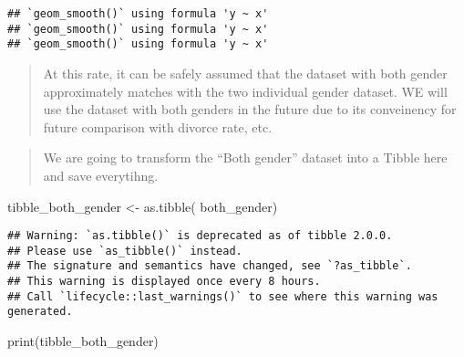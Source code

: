 \documentclass[
]{article}
\newenvironment{Shaded}{\begin{snugshade}}{\end{snugshade}}
\newcommand{\FunctionTok}[1]{\textcolor[rgb]{0.00,0.00,0.00}{#1}}
\newcommand{\NormalTok}[1]{#1}
\newcommand{\OtherTok}[1]{\textcolor[rgb]{0.56,0.35,0.01}{#1}}
\begin{document}
\begin{verbatim}
## `geom_smooth()` using formula 'y ~ x'
## `geom_smooth()` using formula 'y ~ x'
## `geom_smooth()` using formula 'y ~ x'
\end{verbatim}

\begin{quote}
At this rate, it can be safely assumed that the dataset with both gender
approximately matches with the two individual gender dataset. WE will
use the dataset with both genders in the future due to its conveinency
for future comparison with divorce rate, etc.
\end{quote}

\begin{quote}
We are going to transform the ``Both gender'' dataset into a Tibble here
and save everytihng.
\end{quote}

\begin{Shaded}
\begin{Highlighting}[]
\NormalTok{tibble\_both\_gender }\OtherTok{\textless{}{-}} \FunctionTok{as.tibble}\NormalTok{(}
\NormalTok{  both\_gender)}
\end{Highlighting}
\end{Shaded}

\begin{verbatim}
## Warning: `as.tibble()` is deprecated as of tibble 2.0.0.
## Please use `as_tibble()` instead.
## The signature and semantics have changed, see `?as_tibble`.
## This warning is displayed once every 8 hours.
## Call `lifecycle::last_warnings()` to see where this warning was generated.
\end{verbatim}

\begin{Shaded}
\begin{Highlighting}[]
\FunctionTok{print}\NormalTok{(tibble\_both\_gender)}
\end{Highlighting}
\end{Shaded}
\end{document}
